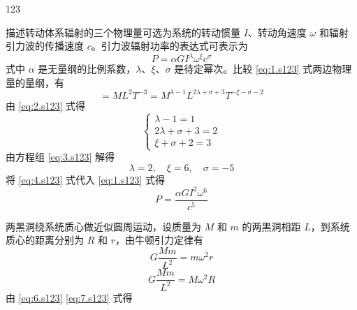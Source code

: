 \begin{solution}{123}
    \begin{subsolution}
        描述转动体系辐射的三个物理量可选为系统的转动惯量 $I$、转动角速度 $\omega$ 和辐射引力波的传播速度 $c$。引力波辐射功率的表达式可表示为
        \begin{equation}
            P = \alpha G I^{\lambda} \omega^{\xi} c^{\sigma}
            \label{eq:1.s123}
        \end{equation}
        式中 $\alpha$ 是无量纲的比例系数，$\lambda$、$\xi$、$\sigma$ 是待定幂次。比较 \eqref{eq:1.s123} 式两边物理量的量纲，有
        \begin{equation}
            [P] = M L^{2} T^{-3} = M^{\lambda - 1} L^{2\lambda + \sigma + 3} T^{-\xi - \sigma - 2}
            \label{eq:2.s123}
        \end{equation}
        由 \eqref{eq:2.s123} 式得
        \begin{equation}
            \left\{ \begin{array}{l} \lambda - 1 = 1 \\ 2\lambda + \sigma + 3 = 2 \\ \xi + \sigma + 2 = 3 \end{array} \right.
            \label{eq:3.s123}
        \end{equation}
        由方程组 \eqref{eq:3.s123} 解得
        \begin{equation}
            \lambda = 2, \quad \xi = 6, \quad \sigma = -5
            \label{eq:4.s123}
        \end{equation}
        将 \eqref{eq:4.s123} 式代入 \eqref{eq:1.s123} 式得
        \begin{equation}
            P = \frac{\alpha G I^{2} \omega^{6}}{c^{5}}
            \label{eq:5.s123}
        \end{equation}
    \end{subsolution}
    \begin{subsolution}
        两黑洞绕系统质心做近似圆周运动，设质量为 $M$ 和 $m$ 的两黑洞相距 $L$，到系统质心的距离分别为 $R$ 和 $r$，由牛顿引力定律有
        \begin{equation}
            G \frac{M m}{L^{2}} = m \omega^{2} r
            \label{eq:6.s123}
        \end{equation}
        \begin{equation}
            G \frac{M m}{L^{2}} = M \omega^{2} R
            \label{eq:7.s123}
        \end{equation}
        由 \eqref{eq:6.s123} \eqref{eq:7.s123} 式得
        \begin{equation}

\end{equation}
\end{subsolution}
\end{solution}
